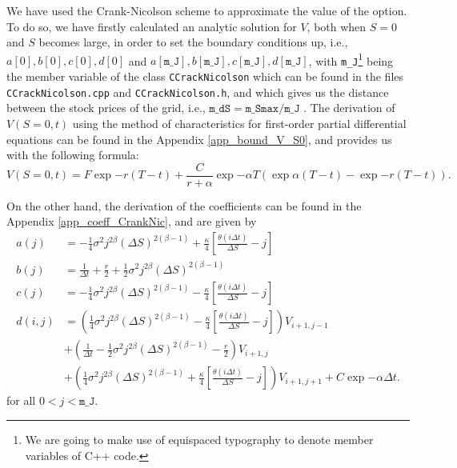 We have used the Crank-Nicolson scheme to approximate the value of the option. To do so, we have firstly calculated an analytic solution for $V$, both when $S=0$ and $S$ becomes large, in order to set the boundary conditions up, i.e., $a[0], b[0], c[0], d[0]$ and $a[\texttt{m\_J}], b[\texttt{m\_J}], c[\texttt{m\_J}], d[\texttt{m\_J}]$, with \texttt{m\_J}\footnote{We are going to make use of equispaced typography to denote member variables of C++ code.} being the member variable of the class \texttt{CCrackNicolson} which can be found in the files \texttt{CCrackNicolson.cpp} and \texttt{CCrackNicolson.h}, and which gives us the distance between the stock prices of the grid, i.e.,  $\texttt{m_dS} = \texttt{m_Smax} / \texttt{m_J}$ . The derivation of $V(S=0, t)$ using the method of characteristics for first-order partial differential equations can be found in the Appendix \ref{app_bound_V_S0}, and provides us with the following formula:
\begin{equation}\label{V_S0}
	V(S=0,t) =  F \exp{-r(T-t)} + \frac{C}{r+\alpha} \exp{-\alpha T}\left( \exp{\alpha (T-t)} -\exp{-r(T-t)} \right).
\end{equation}

On the other hand, the derivation of the coefficients can be found in the Appendix \ref{app_coeff_CrankNic}, and are given by 
\begin{equation}
	\begin{aligned}
		a(j) &= -\frac{1}{4}\sigma^2j^{2\beta}(\Delta S)^{2(\beta -1) }+ \frac{\kappa}{4}\left[\frac{\theta(i\Delta t)}{\Delta S} - j\right] \\
		b(j) &= \frac{1}{\Delta t} + \frac{r}{2} + \frac{1}{2}\sigma^2 j^{2\beta}(\Delta S)^{2(\beta -1) }\\
		c(j) &=  -\frac{1}{4}\sigma^2j^{2\beta}(\Delta S)^{2(\beta -1) } - \frac{\kappa}{4}\left[\frac{\theta(i\Delta t)}{\Delta S} - j\right]\\
		d(i,j)&=\left(\frac{1}{4}\sigma^2 j^{2\beta}(\Delta S)^{2(\beta -1) } - \frac{\kappa}{4}\left[\frac{\theta(i\Delta t)}{\Delta S} - j\right]\right)V_{i+1,j-1}\\
		&+ \left(\frac{1}{\Delta t } - \frac{1}{2}\sigma^2 j^{2\beta}(\Delta S)^{2(\beta -1) }  - \frac{r}{2}\right)V_{i+1,j}\\
		&+ \left(\frac{1}{4}\sigma^2 j^{2\beta}(\Delta S)^{2(\beta -1) }+ \frac{\kappa}{4}\left[\frac{\theta(i\Delta t)}{\Delta S} - j\right]\right)V_{i+1,j+1} + C \exp{-\alpha \Delta t}.
	\end{aligned}
\end{equation}
for all $0< j < \texttt{m_J}$.

